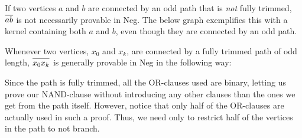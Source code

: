 If two vertices $a$ and $b$ are connected by an odd path that is \textit{not} fully trimmed, $\ol{ab}$ is not necessarily provable in Neg.
The below graph exemplifies this with a kernel containing both $a$ and $b$, even though they are connected by an odd path.\par
\begin{figure}[!h]
  \centering
  \caption{}
  \label{fig:kernel_untrimmed}
\end{figure}
Whenever two vertices, $x_0$ and $x_k$, are connected by a fully trimmed path of odd length, $\ol{x_0x_k}$ is generally provable in Neg in the following way:
\begin{figure}[!h]
  \centering
  \begin{prooftree*}
  \end{prooftree*}
\caption{}
\label{fig:proof_x0xk}
\end{figure}
\FloatBarrier
Since the path is fully trimmed, all the OR-clauses used are binary, letting us prove our NAND-clause without introducing any other clauses than the ones we get from the path itself.
However, notice that only half of the OR-clauses are actually used in such a proof.
Thus, we need only to restrict half of the vertices in the path to not branch.

